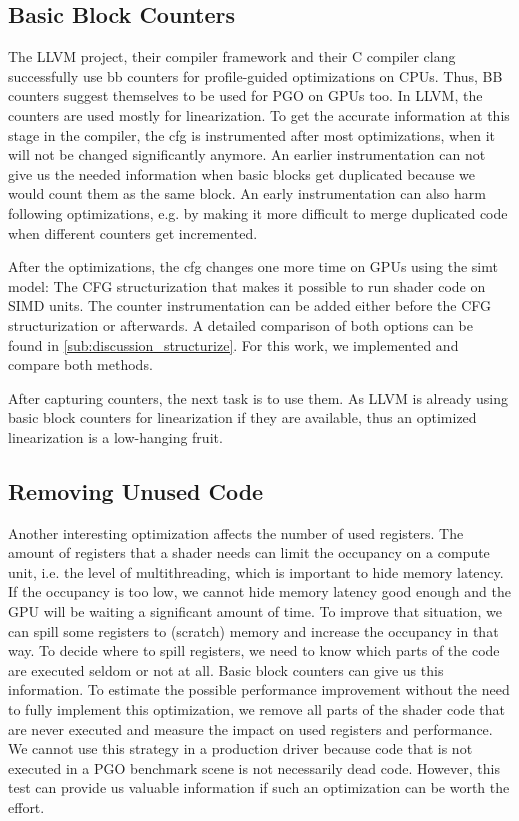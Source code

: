 \subsection{Basic Block Counters}
\label{sub:design_counters}
The LLVM project, their compiler framework and their C compiler clang successfully use \gls{bb} counters for profile-guided optimizations on CPUs. Thus, BB counters suggest themselves to be used for PGO on GPUs too.
In LLVM, the counters are used mostly for linearization. To get the accurate information at this stage in the compiler, the \gls{cfg} is instrumented after most optimizations, when it will not be changed significantly anymore.
An earlier instrumentation can not give us the needed information when basic blocks get duplicated because we would count them as the same block. An early instrumentation can also harm following optimizations, e.g. by making it more difficult to merge duplicated code when different counters get incremented.

After the optimizations, the \gls{cfg} changes one more time on GPUs using the \gls{simt} model: The CFG structurization that makes it possible to run shader code on SIMD units.
The counter instrumentation can be added either before the CFG structurization or afterwards.
A detailed comparison of both options can be found in \cref{sub:discussion_structurize}. For this work, we implemented and compare both methods.

After capturing counters, the next task is to use them. As LLVM is already using basic block counters for linearization if they are available, thus an optimized linearization is a low-hanging fruit.

\subsection{Removing Unused Code}
\label{sub:design_unused}
Another interesting optimization affects the number of used registers.
The amount of registers that a shader needs can limit the occupancy on a compute unit, i.e. the level of multithreading, which is important to hide memory latency.
If the occupancy is too low, we cannot hide memory latency good enough and the GPU will be waiting a significant amount of time.
To improve that situation, we can spill some registers to (scratch) memory and increase the occupancy in that way.
To decide where to spill registers, we need to know which parts of the code are executed seldom or not at all.
Basic block counters can give us this information.
To estimate the possible performance improvement without the need to fully implement this optimization, we remove all parts of the shader code that are never executed and measure the impact on used registers and performance.
We cannot use this strategy in a production driver because code that is not executed in a PGO benchmark scene is not necessarily dead code.
However, this test can provide us valuable information if such an optimization can be worth the effort.

